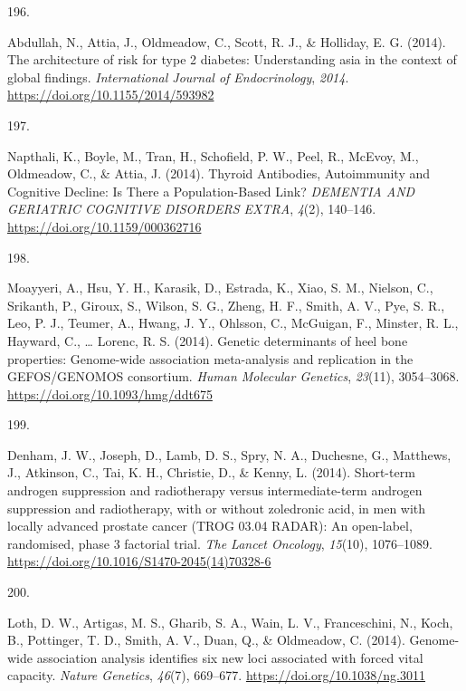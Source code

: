 \documentclass[11pt, a4paper]{awesome-cv}
\newlength{\csllabelwidth}
\newcommand{\CSLLeftMargin}[1]{\parbox[t]{\csllabelwidth}{#1}}
\newcommand{\CSLRightInline}[1]{\parbox[t]{\linewidth - \csllabelwidth}{#1}}
\begin{document}
\leavevmode\hypertarget{ref-abdullah_architecture_2014}{}%
\CSLLeftMargin{196. }
\CSLRightInline{Abdullah, N., Attia, J., Oldmeadow, C., Scott, R. J., \&
Holliday, E. G. (2014). The architecture of risk for type 2 diabetes:
Understanding asia in the context of global findings.
\emph{International Journal of Endocrinology}, \emph{2014}.
\url{https://doi.org/10.1155/2014/593982}}

\leavevmode\hypertarget{ref-napthali_thyroid_2014}{}%
\CSLLeftMargin{197. }
\CSLRightInline{Napthali, K., Boyle, M., Tran, H., Schofield, P. W.,
Peel, R., McEvoy, M., Oldmeadow, C., \& Attia, J. (2014). Thyroid
Antibodies, Autoimmunity and Cognitive Decline: Is There a
Population-Based Link? \emph{DEMENTIA AND GERIATRIC COGNITIVE DISORDERS
EXTRA}, \emph{4}(2), 140--146. \url{https://doi.org/10.1159/000362716}}

\leavevmode\hypertarget{ref-moayyeri_genetic_2014}{}%
\CSLLeftMargin{198. }
\CSLRightInline{Moayyeri, A., Hsu, Y. H., Karasik, D., Estrada, K.,
Xiao, S. M., Nielson, C., Srikanth, P., Giroux, S., Wilson, S. G.,
Zheng, H. F., Smith, A. V., Pye, S. R., Leo, P. J., Teumer, A., Hwang,
J. Y., Ohlsson, C., McGuigan, F., Minster, R. L., Hayward, C., \ldots{}
Lorenc, R. S. (2014). Genetic determinants of heel bone properties:
Genome-wide association meta-analysis and replication in the
GEFOS/GENOMOS consortium. \emph{Human Molecular Genetics},
\emph{23}(11), 3054--3068. \url{https://doi.org/10.1093/hmg/ddt675}}

\leavevmode\hypertarget{ref-denham_short-term_2014}{}%
\CSLLeftMargin{199. }
\CSLRightInline{Denham, J. W., Joseph, D., Lamb, D. S., Spry, N. A.,
Duchesne, G., Matthews, J., Atkinson, C., Tai, K. H., Christie, D., \&
Kenny, L. (2014). Short-term androgen suppression and radiotherapy
versus intermediate-term androgen suppression and radiotherapy, with or
without zoledronic acid, in men with locally advanced prostate cancer
(TROG 03.04 RADAR): An open-label, randomised, phase 3 factorial trial.
\emph{The Lancet Oncology}, \emph{15}(10), 1076--1089.
\url{https://doi.org/10.1016/S1470-2045(14)70328-6}}

\leavevmode\hypertarget{ref-loth_genome-wide_2014}{}%
\CSLLeftMargin{200. }
\CSLRightInline{Loth, D. W., Artigas, M. S., Gharib, S. A., Wain, L. V.,
Franceschini, N., Koch, B., Pottinger, T. D., Smith, A. V., Duan, Q., \&
Oldmeadow, C. (2014). Genome-wide association analysis identifies six
new loci associated with forced vital capacity. \emph{Nature Genetics},
\emph{46}(7), 669--677. \url{https://doi.org/10.1038/ng.3011}}
\end{document}
